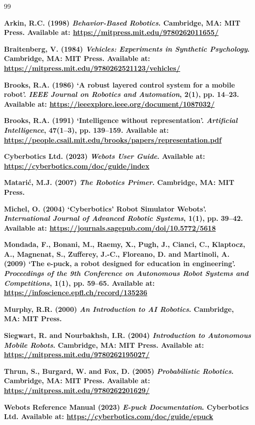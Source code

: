 \documentclass[12pt, a4paper]{article}
\begin{document}
\vspace{0.5cm}
\renewcommand{\refname}{Bibliography}

\begin{thebibliography}{99}

\textbf{Arkin, R.C. (1998) \textit{Behavior-Based Robotics}. Cambridge, MA: MIT Press. Available at: \url{https://mitpress.mit.edu/9780262011655/}}

\textbf{Braitenberg, V. (1984) \textit{Vehicles: Experiments in Synthetic Psychology}. Cambridge, MA: MIT Press. Available at: \url{https://mitpress.mit.edu/9780262521123/vehicles/}}

\textbf{Brooks, R.A. (1986) `A robust layered control system for a mobile robot'. \textit{IEEE Journal on Robotics and Automation}, 2(1), pp. 14--23. Available at: \url{https://ieeexplore.ieee.org/document/1087032/}}

\textbf{Brooks, R.A. (1991) `Intelligence without representation'. \textit{Artificial Intelligence}, 47(1--3), pp. 139--159. Available at: \url{https://people.csail.mit.edu/brooks/papers/representation.pdf}}

\textbf{Cyberbotics Ltd. (2023) \textit{Webots User Guide}. Available at: \url{https://cyberbotics.com/doc/guide/index}}

\textbf{Matari\'{c}, M.J. (2007) \textit{The Robotics Primer}. Cambridge, MA: MIT Press.}

\textbf{Michel, O. (2004) `Cyberbotics' Robot Simulator Webots'. \textit{International Journal of Advanced Robotic Systems}, 1(1), pp. 39--42. Available at: \url{https://journals.sagepub.com/doi/10.5772/5618}}

\textbf{Mondada, F., Bonani, M., Raemy, X., Pugh, J., Cianci, C., Klaptocz, A., Magnenat, S., Zufferey, J.-C., Floreano, D. and Martinoli, A. (2009) `The e-puck, a robot designed for education in engineering'. \textit{Proceedings of the 9th Conference on Autonomous Robot Systems and Competitions}, 1(1), pp. 59--65. Available at: \url{https://infoscience.epfl.ch/record/135236}}

\textbf{Murphy, R.R. (2000) \textit{An Introduction to AI Robotics}. Cambridge, MA: MIT Press.}

\textbf{Siegwart, R. and Nourbakhsh, I.R. (2004) \textit{Introduction to Autonomous Mobile Robots}. Cambridge, MA: MIT Press. Available at: \url{https://mitpress.mit.edu/9780262195027/}}

\textbf{Thrun, S., Burgard, W. and Fox, D. (2005) \textit{Probabilistic Robotics}. Cambridge, MA: MIT Press. Available at: \url{https://mitpress.mit.edu/9780262201629/}}

\textbf{Webots Reference Manual (2023) \textit{E-puck Documentation}. Cyberbotics Ltd. Available at: \url{https://cyberbotics.com/doc/guide/epuck}}

\end{thebibliography}
\end{document}
